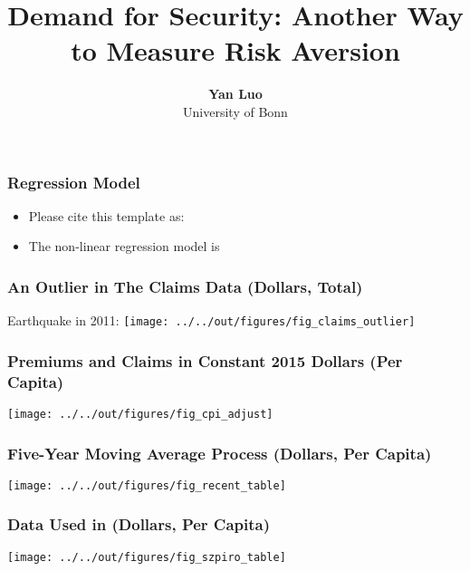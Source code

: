 \documentclass[11pt]{beamer}
\begin{document}
\title{Demand for Security: Another Way to Measure Risk Aversion}

\author[Yan Luo]
{
{\bf Yan Luo}\\
{\small University of Bonn}\\[1ex]
}


\begin{frame}
    \titlepage
    \note{~}
\end{frame}


\begin{frame}[t]
    \frametitle{Regression Model}
    \begin{itemize}
        \item<+-> Please cite this template as: \citet{GaudeckerEconProjectTemplates}
        \item<+-> The non-linear regression model is 
    \end{itemize}
    \note{~}
\end{frame}




\begin{frame}
    \frametitle{An Outlier in The Claims Data (Dollars, Total)}
    Earthquake in 2011:
    \texttt{[image: ../../out/figures/fig\_claims\_outlier]}

\end{frame}

\begin{frame}
    \frametitle{Premiums and Claims in Constant 2015 Dollars (Per Capita)}
    \texttt{[image: ../../out/figures/fig\_cpi\_adjust]}

\end{frame}

\begin{frame}
    \frametitle{Five-Year Moving Average Process (Dollars, Per Capita)}
    \texttt{[image: ../../out/figures/fig\_recent\_table]}

\end{frame}

\begin{frame}
    \frametitle{Data Used in \citet{szpiro1986measuring} (Dollars, Per Capita)}
    \texttt{[image: ../../out/figures/fig\_szpiro\_table]}

\end{frame}
\end{document}
